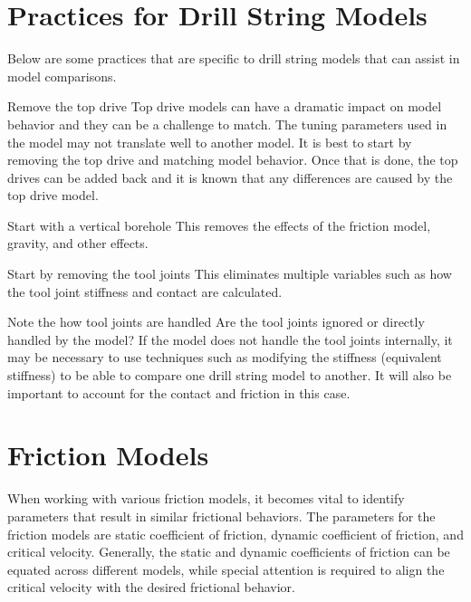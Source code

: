\section{Practices for Drill String Models}
Below are some practices that are specific to drill string models that can assist in model comparisons.

\begin{definition}{Remove the top drive}
Top drive models can have a dramatic impact on model behavior and they can be a challenge to match.  The tuning parameters used in the model may not translate well to another model.  It is best to start by removing the top drive and matching model behavior.  Once that is done, the top drives can be added back and it is known that any differences are caused by the top drive model.
\end{definition}

\begin{definition}{Start with a vertical borehole}
This removes the effects of the friction model, gravity, and other effects.
\end{definition}

\begin{definition}{Start by removing the tool joints}
This eliminates multiple variables such as how the tool joint stiffness and contact are calculated.
\end{definition}

\begin{definition}{Note the how tool joints are handled}
Are the tool joints ignored or directly handled by the model?  If the model does not handle the tool joints internally, it may be necessary to use techniques such as modifying the stiffness (equivalent stiffness) to be able to compare one drill string model to another.  It will also be important to account for the contact and friction in this case.
\end{definition}

\section{Friction Models}
When working with various friction models, it becomes vital to identify parameters that result in similar frictional behaviors.  The parameters for the friction models are static coefficient of friction, dynamic coefficient of friction, and critical velocity. Generally, the static and dynamic coefficients of friction can be equated across different models, while special attention is required to align the critical velocity with the desired frictional behavior.

